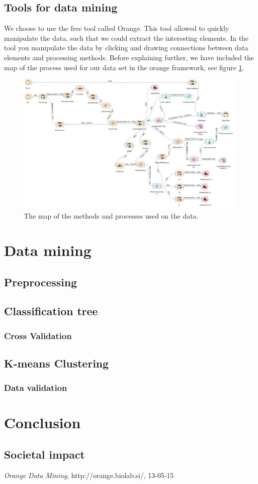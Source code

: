 \documentclass[a4paper,11pt]{article}
\begin{document}
\subsection{Tools for data mining}
We choose to use the free tool called Orange\cite{orange}. This tool allowed to quickly manipulate the data, such that we could extract the interesting elements. 
In the tool you manipulate the data by clicking and drawing connections between data elements and processing methods. Before explaining further, we have included the map of the process used for our data set in the orange framework, see figure \ref{OrangeMap}.

\begin{figure}[h]
	\centering
	\includegraphics[scale=0.35]{orangeMap}
	\caption{The map of the methods and processes used on the data.}
	\label{OrangeMap}
\end{figure}


\section{Data mining}
\subsection{Preprocessing}
\subsection{Classification tree}
\subsubsection{Cross Validation}
\subsection{K-means Clustering}
\subsubsection{Data validation}

\section{Conclusion}
\subsection{Societal impact}




\appendix
\begin{thebibliography}{9}

  \emph{Orange Data Mining},
  http://orange.biolab.si/,
  13-05-15
\end{thebibliography}
\end{document}
